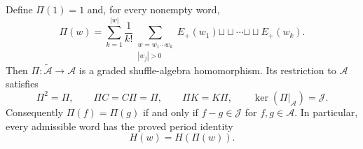 \begin{theorem}\label{cay:thm:projector}
Define $\Pi(1)=1$ and, for every nonempty word,
\begin{equation}\label{cay:eq:projection}
 \boxed{\displaystyle
 \Pi(w)=\sum_{k=1}^{|w|}\frac1{k!}
   \sum_{\substack{w=w_1\cdots w_k\\ |w_j|>0}}
    E_+(w_1)\mathbin{\sqcup\!\sqcup}\cdots
     \mathbin{\sqcup\!\sqcup}E_+(w_k).}
\end{equation}
Then $\Pi:\widetilde{\mathcal A}\to\mathcal A$ is a graded
shuffle-algebra homomorphism.  Its restriction to $\mathcal A$ satisfies
\begin{equation}\label{cay:eq:projection-properties}
 \Pi^2=\Pi,\qquad \Pi C=C\Pi=\Pi,\qquad \Pi K=K\Pi,
 \qquad \ker(\Pi|_{\mathcal A})=\mathcal J.
\end{equation}
Consequently $\Pi(f)=\Pi(g)$ if and only if $f-g\in\mathcal J$ for
$f,g\in\mathcal A$.  In particular, every admissible word has the
proved period identity
\begin{equation}\label{cay:eq:period-normal-form}
 H(w)=H(\Pi(w)).
\end{equation}
\end{theorem}

